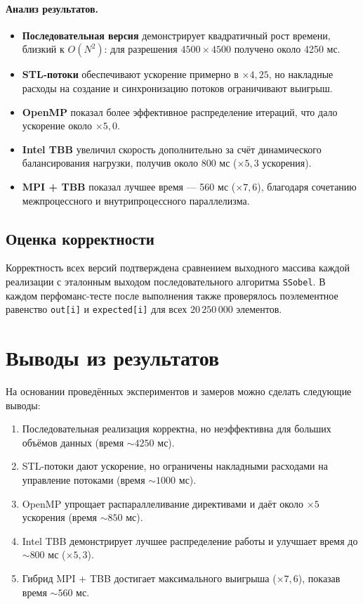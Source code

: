 \documentclass[12pt]{article}
\begin{document}
\paragraph{Анализ результатов.}  
\begin{itemize}
    \item \textbf{Последовательная версия} демонстрирует квадратичный рост времени, близкий к $O(N^2)$: для разрешения $4500\times4500$ получено около 4250 мс.
    \item \textbf{STL-потоки} обеспечивают ускорение примерно в $\times 4{,}25$, но накладные расходы на создание и синхронизацию потоков ограничивают выигрыш.
    \item \textbf{OpenMP} показал более эффективное распределение итераций, что дало ускорение около $\times 5{,}0$.
    \item \textbf{Intel TBB} увеличил скорость дополнительно за счёт динамического балансирования нагрузки, получив около 800 мс ($\times 5{,}3$ ускорения).
    \item \textbf{MPI + TBB} показал лучшее время — 560 мс ($\times 7{,}6$), благодаря сочетанию межпроцессного и внутрипроцессного параллелизма.
\end{itemize}

\subsection{Оценка корректности}

Корректность всех версий подтверждена сравнением выходного массива каждой реализации с эталонным выходом последовательного алгоритма \texttt{SSobel}. В каждом перфоманс-тесте после выполнения также проверялось поэлементное равенство \texttt{out[i]} и \texttt{expected[i]} для всех $20\,250\,000$ элементов.

\section{Выводы из результатов}

На основании проведённых экспериментов и замеров можно сделать следующие выводы:
\begin{enumerate}
    \item Последовательная реализация корректна, но неэффективна для больших объёмов данных (время $\sim 4250$ мс).
    \item STL-потоки дают ускорение, но ограничены накладными расходами на управление потоками (время $\sim 1000$ мс).
    \item OpenMP упрощает распараллеливание директивами и даёт около $\times 5$ ускорения (время $\sim 850$ мс).
    \item Intel TBB демонстрирует лучшее распределение работы и улучшает время до $\sim 800$ мс ($\times 5{,}3$).
    \item Гибрид MPI + TBB достигает максимального выигрыша ($\times 7{,}6$), показав время $\sim 560$ мс.
\end{enumerate}
\end{document}

